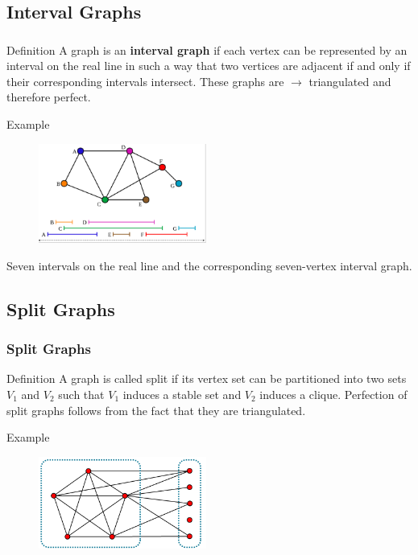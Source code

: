 \documentclass{beamer}
\begin{document}
\subsection{Interval Graphs}
\begin{frame}\frametitle{}
\begin{block}{Definition}
A graph is an \textbf{interval graph} if each vertex can be represented by an interval on the real line in such a way that two vertices are adjacent if and only if their corresponding intervals intersect. These graphs are $\longrightarrow$ triangulated and therefore perfect.
\end{block}
\begin{exampleblock}{Example}
\begin{figure}[h]
\includegraphics[width=5.5cm]{picture4}
\end{figure}
\fontsize{8.5pt}{7.2}\selectfont
Seven intervals on the real line and the corresponding seven-vertex interval graph.
\end{exampleblock}
\end{frame}

\subsection{Split Graphs}
\begin{frame}\frametitle{Split Graphs}
\begin{block}{Definition}
A graph is called split if its vertex set can be partitioned into two sets $V_1$ and $V_2$ such that $V_1$ induces a stable set and $V_2$ induces a clique. Perfection of split graphs follows from the fact that they are triangulated.
\end{block}
\begin{exampleblock}{Example}
\begin{figure}[h]
\includegraphics[width=5.5cm]{picture3}
\end{figure}
\end{exampleblock}
\end{frame}
\end{document}
